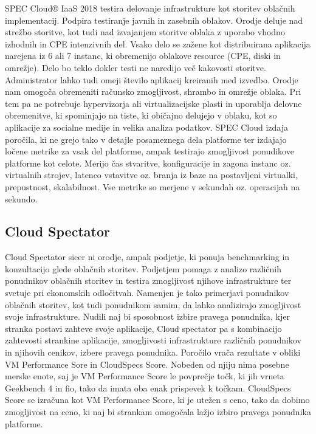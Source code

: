 SPEC Cloud® IaaS 2018 testira delovanje infrastrukture kot storitev oblačnih implementacij. Podpira testiranje javnih in zasebnih oblakov. Orodje deluje nad strežbo storitve, kot tudi nad izvajanjem storitve oblaka z uporabo vhodno izhodnih in CPE intenzivnih del. Vsako delo se zažene kot distribuirana aplikacija narejena iz 6 ali 7 instanc, ki obremenijo oblakove resource (CPE, diski in omrežje). Delo bo teklo dokler testi ne naredijo več kakovosti storitve. Administrator lahko tudi omeji število aplikacij kreiranih med izvedbo.
Orodje nam omogoča obremeniti računsko zmogljivost, shrambo in omrežje oblaka. Pri tem pa ne potrebuje hypervizorja ali virtualizacijske plasti in uporablja delovne obremenitve, ki spominjajo na tiste, ki običajno delujejo v oblaku, kot so aplikacije za socialne medije in velika analiza podatkov.
SPEC Cloud izdaja poročila, ki ne grejo tako v detajle posameznega dela platforme ter izdajajo ločene metrike za vsak del platforme, ampak testirajo zmogljivost ponudikove platforme kot celote. Merijo čas stvaritve, konfiguracije in zagona instanc oz. virtualnih strojev, latenco vstavitve oz. branja iz baze na postavljeni virtualki, prepustnost, skalabilnost. Vse metrike so merjene v sekundah oz. operacijah na sekundo.

\subsection{Cloud Spectator}

Cloud Spectator sicer ni orodje, ampak podjetje, ki ponuja benchmarking in konzultacijo glede oblačnih storitev. Podjetjem pomaga z analizo različnih ponudnikov oblačnih storitev in testira zmogljivost njihove infrastrukture ter svetuje pri ekonomskih odločitvah. Namenjen je tako primerjavi ponudnikov oblačnih storitev, kot tudi ponudnikom samim, da lahko analizirajo zmogljivost svoje infrastrukture. Nudili naj bi sposobnost izbire pravega ponudnika, kjer stranka postavi zahteve svoje aplikacije, Cloud spectator pa s kombinacijo zahtevosti strankine aplikacije, zmogljivosti infrastrukture različnih ponudnikov in njihovih cenikov, izbere pravega ponudnika.
Poročilo vrača rezultate v obliki VM Performance Sore in CloudSpecs Score. Nobeden od njiju nima posebne merske enote, saj je VM Performance Score le povprečje točk, ki jih vrneta Geekbench 4 in fio, tako da imata oba enak prispevek k točkam. CloudSpecs Score se izračuna kot VM Performance Score, ki je utežen s ceno, tako da dobimo zmogljivost na ceno, ki naj bi strankam omogočala lažjo izbiro pravega ponudnika platforme.

